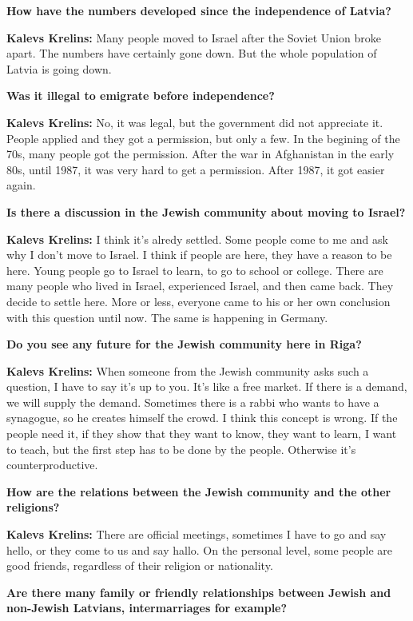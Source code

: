 \textbf{How have the numbers developed since the independence of Latvia?}  

\textbf{Kalevs Krelins:} Many people moved to Israel after the Soviet Union broke apart. The numbers have certainly gone down. But the whole population of Latvia is going down.  

\textbf{Was it illegal to emigrate before independence?} 

\textbf{Kalevs Krelins:} No, it was legal, but the government did not appreciate it. People applied and they got a permission, but only a few. In the begining of the 70s, many people got the permission. After the war in Afghanistan in the early 80s, until 1987, it was very hard to get a permission. After 1987, it got easier again. 

\textbf{Is there a discussion in the Jewish community about moving to Israel?} 

\textbf{Kalevs Krelins:} I think it's alredy settled. Some people come to me and ask why I don't move to Israel. I think if people are here, they have a reason to be here. Young people go to Israel to learn, to go to school or college. There are many people who lived in Israel, experienced Israel, and then came back. They decide to settle here. More or less, everyone came to his or her own conclusion with this question until now. The same is happening in Germany.  

\textbf{Do you see any future for the Jewish community here in Riga?} 

\textbf{Kalevs Krelins:} When someone from the Jewish community asks such a question, I have to say it’s up to you. It’s like a free market. If there is a demand, we will supply the demand. Sometimes there is a rabbi who wants to have a synagogue, so he creates himself the crowd. I think this concept is wrong. If the people need it, if they show that they want to know, they want to learn, I want to teach, but the first step has to be done by the people. Otherwise it’s counterproductive.  

\textbf{How are the relations between the Jewish community and the other religions?} 

\textbf{Kalevs Krelins:} There are official meetings, sometimes I have to go and say hello, or they come to us and say hallo. On the personal level, some people are good friends, regardless of their religion or nationality.  

\textbf{Are there many family or friendly relationships between Jewish and non-Jewish Latvians, intermarriages for example?} 

